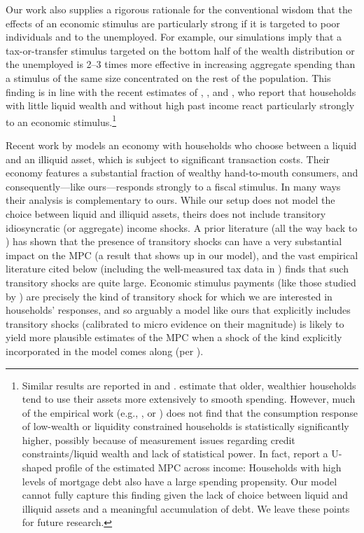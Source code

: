 \documentclass[12pt,titlepage]{econtex}
\begin{document}
Our work also supplies a rigorous rationale for the conventional
wisdom that the effects of an economic stimulus are particularly
strong if it is targeted to poor individuals and to the unemployed.
For example, our simulations imply that a tax-or-transfer stimulus targeted on the
bottom half of the wealth distribution or the unemployed is 2--3
times more effective in increasing aggregate spending than a
stimulus of the same size concentrated on the rest of the
population. This finding is in line with the recent estimates of
\citet{bppInequality}, \citet{brodaParker:stimulus2008},
\citet{leth-petersen:liquidity} and
\citet{jappelliPistaferri_FPMPC}, who report that households with
little liquid wealth and without high past income react particularly
strongly to an economic stimulus.\footnote{Similar results are reported in  \citet{jpsTax} and
\citet{aslCredit}.  \citet{bps:familyLaborS}
estimate that older, wealthier households tend to use their assets
more extensively to smooth spending. However, much of the empirical
work (e.g., \citet{souleles:responseToReaganCuts},
\citet{misraSurico:heteroResponses} or \citet{psjmStim}) does not
find that the consumption response of low-wealth or liquidity
constrained households is statistically significantly higher,
possibly because of  measurement issues regarding credit
constraints/liquid wealth and lack of statistical power. In fact, \citet{misraSurico:heteroResponses} report a U-shaped profile of the estimated MPC across income: Households with high levels of mortgage debt also have a large spending propensity. Our model cannot fully capture this finding given the lack of choice between liquid and illiquid assets and a meaningful accumulation of debt. We leave these points for future research.}

Recent work by \citet{kvStim} models an economy with
households who choose between a liquid and an illiquid asset, which is
subject to significant transaction costs. Their economy features a
substantial fraction of wealthy hand-to-mouth consumers, and
consequently---like ours---responds strongly to a fiscal stimulus. In
many ways their analysis is complementary to ours.  While our setup
does not model the choice between liquid and illiquid assets, theirs
does not include transitory idiosyncratic (or aggregate) income
shocks.  A prior literature (all the way back to
\cite{deatonLiqConstr,deatonUnderstandingC}) has shown that the presence of
transitory shocks can have a very substantial impact on the MPC (a
result that shows up in our model), and the vast empirical literature cited
below (including the well-measured tax data in \cite{dhprvInequality})
finds that such transitory shocks are quite large.  Economic
stimulus payments (like those studied by
\cite{brodaParker:stimulus2008}) are precisely the kind of transitory
shock for which we are interested in households' responses, and so arguably a
model like ours that explicitly includes transitory shocks (calibrated to micro
evidence on their magnitude) is likely to yield more plausible
estimates of the MPC when a shock of the kind explicitly
incorporated in the model comes along (per
\cite{brodaParker:stimulus2008}).
\end{document}
